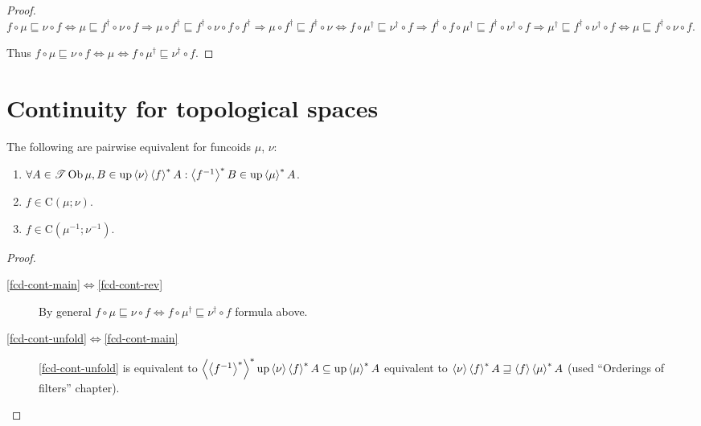 \begin{proof}
$f \circ \mu \sqsubseteq \nu \circ f \Leftrightarrow \mu
\sqsubseteq f^{\dagger} \circ \nu \circ f \Rightarrow \mu \circ
f^{\dagger} \sqsubseteq f^{\dagger} \circ \nu \circ f \circ f^{\dagger}
\Rightarrow \mu \circ f^{\dagger} \sqsubseteq f^{\dagger} \circ \nu
\Leftrightarrow f \circ \mu^{\dagger} \sqsubseteq \nu^{\dagger} \circ f
\Rightarrow f^{\dagger} \circ f \circ \mu^{\dagger} \sqsubseteq
f^{\dagger} \circ \nu^{\dagger} \circ f \Rightarrow \mu^{\dagger}
\sqsubseteq f^{\dagger} \circ \nu^{\dagger} \circ f \Leftrightarrow \mu
\sqsubseteq f^{\dagger} \circ \nu \circ f$.

Thus $f \circ \mu \sqsubseteq \nu \circ f \Leftrightarrow \mu \Leftrightarrow
f \circ \mu^{\dagger} \sqsubseteq \nu^{\dagger} \circ f$.
\end{proof}

\section{Continuity for topological spaces}

\begin{prop}
  The following are pairwise equivalent for funcoids $\mu$, $\nu$:
  \begin{enumerate}
    \item\label{fcd-cont-unfold} $\forall A \in \mathscr{T} \operatorname{Ob} \mu, B \in \operatorname{up}
    \left\langle \nu\right\rangle \left\langle f\right\rangle ^{\ast} A : \left\langle f^{- 1}\right\rangle ^{\ast}
    B \in \operatorname{up} \left\langle \mu\right\rangle ^{\ast} A$.

    \item\label{fcd-cont-main}  $f \in \mathrm{C} (\mu; \nu)$.

    \item\label{fcd-cont-rev} $f \in \mathrm{C} (\mu^{- 1} ; \nu^{- 1})$.
  \end{enumerate}
\end{prop}

\begin{proof}
  ~
  \begin{description}
  \item[\ref{fcd-cont-main}$\Leftrightarrow$\ref{fcd-cont-rev}] By general $f \circ \mu \sqsubseteq \nu \circ
  f \Leftrightarrow f \circ \mu^{\dagger} \sqsubseteq \nu^{\dagger}
  \circ f$ formula above.

  \item[\ref{fcd-cont-unfold}$\Leftrightarrow$\ref{fcd-cont-main}] \ref{fcd-cont-unfold} is equivalent to
  $\left\langle \left\langle f^{- 1}\right\rangle ^{\ast}\right\rangle ^{\ast}
  \operatorname{up} \left\langle \nu\right\rangle \left\langle f\right\rangle ^{\ast} A \subseteq \operatorname{up}
  \left\langle \mu\right\rangle ^{\ast} A$ equivalent to $\left\langle \nu\right\rangle \left\langle f\right\rangle ^{\ast}
  A \sqsupseteq \left\langle f\right\rangle \left\langle \mu\right\rangle ^{\ast} A$
  (used ``Orderings of filters'' chapter).
  \end{description}
\end{proof}

